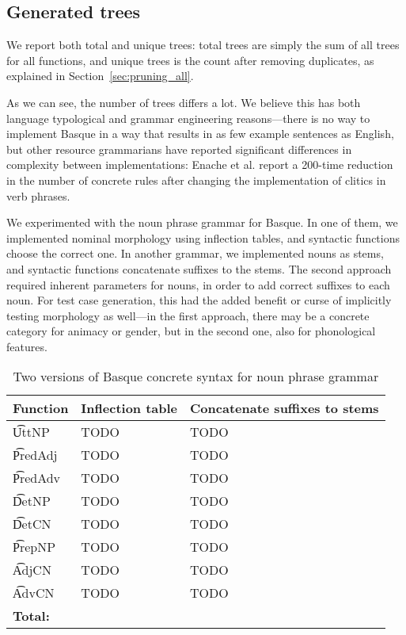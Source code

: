 \subsection{Generated trees}

We report both total and unique trees: total trees are simply the sum
of all trees for all functions, and unique trees is the count after
removing duplicates, as explained in Section~\ref{sec:pruning_all}.

As we can see, the number of trees differs a lot. We believe this has
both language typological and grammar engineering reasons---there
is no way to implement Basque in a way that results in as few example
sentences as English, but other resource grammarians have reported
significant differences in complexity between implementations: Enache
et al. \cite{enache2010} report a 200-time reduction in the number of
concrete rules after changing the implementation of clitics in verb
phrases.

We experimented with the noun phrase grammar for
Basque. In one of them, we implemented nominal morphology using
inflection tables, and syntactic functions choose the correct one.
In another grammar, we implemented nouns as stems, and syntactic
functions concatenate suffixes to the stems. The second approach
required inherent parameters for nouns, in order to add correct
suffixes to each noun. For test case generation, this had the added
benefit or curse of implicitly testing morphology as well---in the first
approach, there may be a concrete category for animacy or gender, but
in the second one, also for phonological features. 

\begin{table}[h]

\centering
\begin{tabular}{| l | l | l |}
\hline
{\bf Function} & {\bf Inflection table}
   & {\bf Concatenate suffixes to stems} \\ \hline
 
\t{UttNP}    & TODO & TODO  \\
\t{PredAdj}  & TODO & TODO  \\
\t{PredAdv}  & TODO & TODO    \\
\t{DetNP}    & TODO & TODO   \\
\t{DetCN}    & TODO & TODO   \\
\t{PrepNP}   & TODO & TODO   \\
\t{AdjCN}    & TODO & TODO   \\
\t{AdvCN}    & TODO & TODO   \\ \hline
{\bf Total:} & & \\ 
\hline
\end{tabular}
\caption{Two versions of Basque concrete syntax for noun phrase grammar}
\label{basque_versions}
\end{table}


